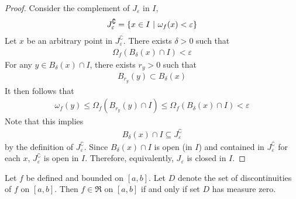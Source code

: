 \documentclass[thmcnt=section, 12pt]{my-elegantbook}
\begin{document}
\begin{proof}
    Consider the complement of $J_\varepsilon$ in $I$,
    \begin{align*}
        J_\varepsilon^\complement
        = \left\{ x \in I \ \middle| \ \omega_f(x) < \varepsilon \right\}
    \end{align*}
    Let $x$ be an arbitrary point in $J_\varepsilon^\complement$.
    There exists $\delta > 0$ such that
    \begin{align*}
        \Omega_f(B_\delta (x) \cap I) < \varepsilon
    \end{align*}
    For any $y \in B_\delta(x) \cap I$,
    there exists $r_y > 0$ such that
    \begin{align*}
        B_{r_y}(y) \subset B_{\delta}(x)
    \end{align*}
    It then follows that
    \begin{align*}
        \omega_f(y) \leq \Omega_f(B_{r_y}(y) \cap I)
        \leq \Omega_f(B_\delta(x) \cap I)
        < \varepsilon
    \end{align*}
    Note that this implies
    \begin{align*}
        B_\delta(x) \cap I \subseteq J_\varepsilon^\complement
    \end{align*}
    by the definition of $J_\varepsilon^\complement$.
    Since $B_\delta(x) \cap I$ is open (in $I$) and contained
    in $J_\varepsilon^\complement$ for each $x$,
    $J_\varepsilon^\complement$ is open in $I$.
    Therefore, equivalently, $J_\varepsilon$ is closed in $I$.
\end{proof}


\begin{theorem} \label{thm:89}
    Let $f$ be defined and bounded on $[a, b]$.
    Let $D$ denote the set of discontinuities of $f$ on $[a, b]$.
    Then $f \in \mathfrak{R}$ on $[a, b]$
    if and only if
    set $D$ has measure zero.
\end{theorem}
\end{document}
